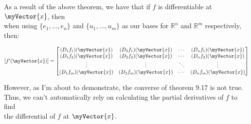 \documentclass{book}
\newcommand{\retTwo}{\hfill\bigbreak}
\newcommand{\mVec}[1]{\myVector{#1}}
\begin{document}
As a result of the above theorem, we have that if $f$ is differentiable at $\mVec{x}$, then\\ when using $\{e_1, \ldots, e_n\}$ and $\{u_1, \ldots, u_m\}$ as our bases for $\mathbb{R}^n$ and $\mathbb{R}^m$ respectively,\\ then:

{\centering$[f^\prime(\mVec{x})] = \begin{bmatrix}
   (D_1f_1)(\mVec{x}) & (D_2f_1)(\mVec{x}) & \cdots & (D_nf_1)(\mVec{x}) \\
   (D_1f_2)(\mVec{x}) & (D_2f_2)(\mVec{x}) & \cdots & (D_nf_2)(\mVec{x}) \\
   \vdots & \vdots & \ddots & \vdots \\
   (D_1f_m)(\mVec{x}) & (D_2f_m)(\mVec{x}) & \cdots & (D_nf_m)(\mVec{x})
\end{bmatrix}$\retTwo\par}

However, as I'm about to demonstrate, the converse of theorem 9.17 is not true.\\ Thus, we can't automatically rely on calculating the partial derivatives of $f$ to find\\ the differential of $f$ at $\mVec{x}$.\retTwo
\end{document}

